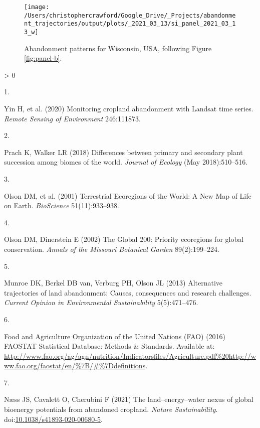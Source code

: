 \documentclass[9pt,twoside,lineno]{pnas-new}
\newlength{\csllabelwidth}
\newlength{\cslhangindent}
\newenvironment{CSLReferences}[2] %
 {%
  \setlength{\parindent}{0pt}
  \ifodd #1 \everypar{\setlength{\hangindent}{\cslhangindent}}\ignorespaces\fi
  \ifnum #2 > 0
  \setlength{\parskip}{#2\baselineskip}
  \fi
 }%
 {}
\newcommand{\CSLLeftMargin}[1]{\parbox[t]{\csllabelwidth}{#1}}
\newcommand{\CSLRightInline}[1]{\parbox[t]{\linewidth - \csllabelwidth}{#1}\break}
\begin{document}
\begin{figure}
\texttt{[image: /Users/christophercrawford/Google\_Drive/\_Projects/abandonment\_trajectories/output/plots/\_2021\_03\_13/si\_panel\_2021\_03\_13\_w]} \caption{Abandonment patterns for Wisconsin, USA, following Figure \ref{fig:panel-b}.}\label{fig:panel-w}
\end{figure}

\showmatmethods
\showacknow
\pnasbreak

\hypertarget{refs}{}
\begin{CSLReferences}{0}{0}
\leavevmode\hypertarget{ref-Yin2020}{}%
\CSLLeftMargin{1. }
\CSLRightInline{Yin H, et al. (2020) {Monitoring cropland abandonment with Landsat time series}. \emph{Remote Sensing of Environment} 246:111873.}

\leavevmode\hypertarget{ref-Prach2018}{}%
\CSLLeftMargin{2. }
\CSLRightInline{Prach K, Walker LR (2018) {Differences between primary and secondary plant succession among biomes of the world}. \emph{Journal of Ecology} (May 2018):510--516.}

\leavevmode\hypertarget{ref-Olson2001}{}%
\CSLLeftMargin{3. }
\CSLRightInline{Olson DM, et al. (2001) {Terrestrial Ecoregions of the World: A New Map of Life on Earth}. \emph{BioScience} 51(11):933--938.}

\leavevmode\hypertarget{ref-Olson2002}{}%
\CSLLeftMargin{4. }
\CSLRightInline{Olson DM, Dinerstein E (2002) {The Global 200: Priority ecoregions for global conservation}. \emph{Annals of the Missouri Botanical Garden} 89(2):199--224.}

\leavevmode\hypertarget{ref-Munroe2013}{}%
\CSLLeftMargin{5. }
\CSLRightInline{Munroe DK, Berkel DB van, Verburg PH, Olson JL (2013) {Alternative trajectories of land abandonment: Causes, consequences and research challenges}. \emph{Current Opinion in Environmental Sustainability} 5(5):471--476.}

\leavevmode\hypertarget{ref-FAO2016}{}%
\CSLLeftMargin{6. }
\CSLRightInline{Food and Agriculture Organization of the United Nations (FAO) (2016) {FAOSTAT Statistical Database: Methods {\&} Standards}. Available at: \url{http://www.fao.org/ag/agn/nutrition/Indicatorsfiles/Agriculture.pdf\%20http://www.fao.org/faostat/en/\%7B/\#\%7Ddefinitions}.}

\leavevmode\hypertarget{ref-Naess2021}{}%
\CSLLeftMargin{7. }
\CSLRightInline{Næss JS, Cavalett O, Cherubini F (2021) {The land--energy--water nexus of global bioenergy potentials from abandoned cropland}. \emph{Nature Sustainability}. doi:\href{https://doi.org/10.1038/s41893-020-00680-5}{10.1038/s41893-020-00680-5}.}


\end{CSLReferences}
\end{document}
